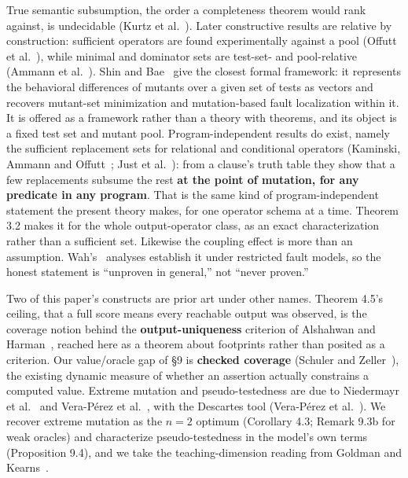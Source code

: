 \documentclass[conference]{IEEEtran}
\theoremstyle{run}
\begin{document}
True semantic subsumption, the order a completeness theorem would rank against, is undecidable (Kurtz et al.~\cite{kurtz2015}). Later constructive results are relative by construction: sufficient operators are found experimentally against a pool (Offutt et al.~\cite{offutt1996}), while minimal and dominator sets are test-set- and pool-relative (Ammann et al.~\cite{ammann2014}). Shin and Bae~\cite{shin2016} give the closest formal framework: it represents the behavioral differences of mutants over a given set of tests as vectors and recovers mutant-set minimization and mutation-based fault localization within it. It is offered as a framework rather than a theory with theorems, and its object is a fixed test set and mutant pool. Program-independent results do exist, namely the sufficient replacement sets for relational and conditional operators (Kaminski, Ammann and Offutt~\cite{kaminski2013}; Just et al.~\cite{just2012}): from a clause's truth table they show that a few replacements subsume the rest \textbf{at the point of mutation, for any predicate in any program}. That is the same kind of program-independent statement the present theory makes, for one operator schema at a time. Theorem 3.2 makes it for the whole output-operator class, as an exact characterization rather than a sufficient set. Likewise the coupling effect is more than an assumption. Wah's~\cite{wah2003} analyses establish it under restricted fault models, so the honest statement is ``unproven in general,'' not ``never proven.''

Two of this paper's constructs are prior art under other names. Theorem 4.5's ceiling, that a full score means every reachable output was observed, is the coverage notion behind the \textbf{output-uniqueness} criterion of Alshahwan and Harman~\cite{alshahwan2014}, reached here as a theorem about footprints rather than posited as a criterion. Our value/oracle gap of \S 9 is \textbf{checked coverage} (Schuler and Zeller~\cite{schuler2013}), the existing dynamic measure of whether an assertion actually constrains a computed value. Extreme mutation and pseudo-testedness are due to Niedermayr et al.~\cite{niedermayr2016} and Vera-P\'{e}rez et al.~\cite{veraperez2019}, with the Descartes tool (Vera-P\'{e}rez et al.~\cite{descartes2018}). We recover extreme mutation as the $n = 2$ optimum (Corollary 4.3; Remark 9.3b for weak oracles) and characterize pseudo-testedness in the model's own terms (Proposition 9.4), and we take the teaching-dimension reading from Goldman and Kearns~\cite{goldman1995}.
\end{document}
